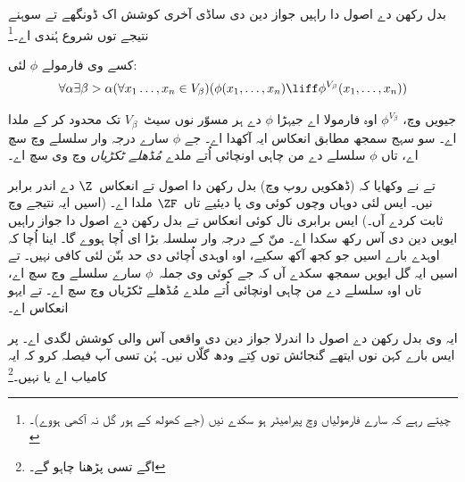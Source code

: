 \documentclass[../../../include/open-logic-section]{subfiles}
\begin{document}

بدل رکھن دے اصول دا \stagesinex راہیں جواز دین دی ساڈی آخری کوشش اک ڈونگھے تے سوہنے نتیجے توں شروع ہُندی اے۔\footnote{چیتے رہے کہ سارے فارمولیاں وچ پیرامیٹر ہو سکدے نیں (جے کھولھ کے ہور گل نہ آکھی ہووے)۔}
\begin{thm}
کسے وی فارمولے $\phi$ لئی:
\[
\forall \alpha \exists \beta > \alpha (\forall x_1 \ldots, x_n \in
V_\beta)(\phi(x_1, \ldots, x_n) \liff \phi^{V_\beta}(x_1, \ldots, x_n))
\]
\end{thm}
\noindent
جیویں  وچ، $\phi^{V_\beta}$ اوہ فارمولا اے جیہڑا $\phi$ دے ہر مسوّر نوں سیٹ~$V_\beta$ تک محدود کر کے ملدا اے۔ سو سہج سمجھ مطابق انعکاس ایہ آکھدا اے۔ جے $\phi$ سارے درجہ وار سلسلے وچ سچ اے، تاں $\phi$ سلسلے دے من چاہی اونچائی اُتے ملدے \emph{مُڈھلے ٹکڑیاں} وچ وی سچ اے۔

\citet{Montague1961} تے \citet{Levy1960} نے وکھایا کہ (ڈھکویں روپ وچ) بدل رکھن دا اصول تے انعکاس~$\Z$ دے اندر برابر نیں۔ ایس لئی دوہاں وچوں کوئی وی پا دیئیے تاں~$\ZF$ ملدا اے۔ (اسیں ایہ نتیجے  وچ ثابت کردے آں۔) ایس برابری نال کوئی انعکاس تے بدل رکھن دے اصول دا جواز \stagesinex{} راہیں ایویں دین دی آس رکھ سکدا اے۔ \stagesinex منّ کے درجہ وار سلسلہ بڑا ای اُچا ہووے گا۔ اینا اُچا کہ اوہدے بارے اسیں جو کجھ آکھ سکیے، اوہ اوہدی اُچائی دی حد بنّن لئی کافی نہیں۔ تے اسیں ایہ گل ایویں سمجھ سکدے آں کہ جے کوئی وی جملہ~$\phi$ سارے سلسلے وچ سچ اے، تاں اوہ سلسلے دے من چاہی اونچائی اُتے ملدے مُڈھلے ٹکڑیاں وچ سچ اے۔ تے ایہو انعکاس اے۔

ایہ وی بدل رکھن دے اصول دا اندرلا جواز دین دی واقعی آس والی کوشش لگدی اے۔ پر ایس بارے کہن نوں ایتھے گنجائش توں کِتے ودھ گلّاں نیں۔ ہُن تسی آپ فیصلہ کرو کہ ایہ کامیاب اے یا نہیں۔\footnote{اگے تسی \citet[95--100]{Incurvati2020} پڑھنا چاہو گے۔}
\end{document}
